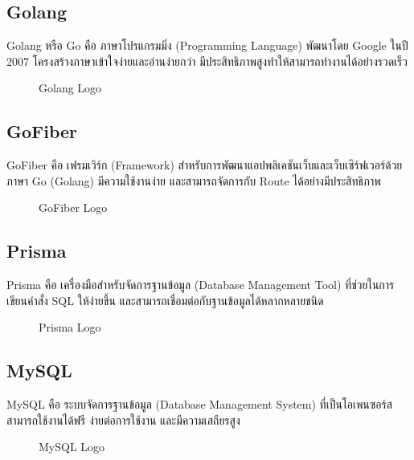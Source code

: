 \newpage

\subsection{Golang}

Golang หรือ Go คือ ภาษาโปรแกรมมิ่ง (Programming Language) พัฒนาโดย Google ในปี 2007 โครงสร้างภาษาเข้าใจง่ายและอ่านง่ายกว่า มีประสิทธิภาพสูงทำให้สามารถทำงานได้อย่างรวดเร็ว \cite{WhatIsGolang}

\begin{figure}[H]
    \centering
    \caption{Golang Logo}
    \label{fig:golang}
\end{figure}

\subsection{GoFiber}

GoFiber คือ เฟรมเวิร์ก (Framework) สำหรับการพัฒนาแอปพลิเคชันเว็บและเว็บเซิร์ฟเวอร์ด้วยภาษา Go (Golang) มีความใช้งานง่าย และสามารถจัดการกับ Route ได้อย่างมีประสิทธิภาพ \cite{FiberAndGormRunGolangApp}

\begin{figure}[H]
    \centering
    \caption{GoFiber Logo}
    \label{fig:gofiber}
\end{figure}

\subsection{Prisma}

Prisma คือ เครื่องมือสำหรับจัดการฐานข้อมูล (Database Management Tool) ที่ช่วยในการเขียนคำสั่ง SQL ให้ง่ายขึ้น และสามารถเชื่อมต่อกับฐานข้อมูลได้หลากหลายชนิด \cite{WhatIsPrisma}

\begin{figure}[H]
    \centering
    \caption{Prisma Logo}
    \label{fig:prisma}
\end{figure}

\newpage

\subsection{MySQL}

MySQL คือ ระบบจัดการฐานข้อมูล (Database Management System) ที่เป็นโอเพนซอร์ส สามารถใช้งานได้ฟรี ง่ายต่อการใช้งาน และมีความเสถียรสูง \cite{WhatIsMySQL}

\begin{figure}[H]
    \centering
    \caption{MySQL Logo}
    \label{fig:mysql}
\end{figure}

